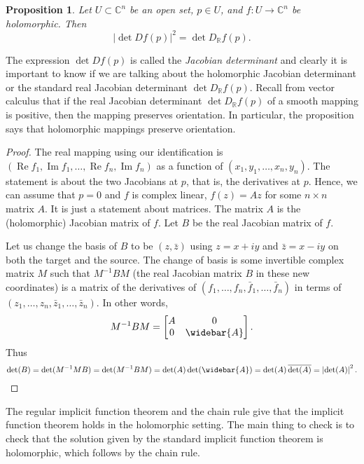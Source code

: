 \documentclass[12pt,openany]{book}
\renewcommand{\Re}{\operatorname{Re}}
\renewcommand{\Im}{\operatorname{Im}}
\newcommand{\abs}[1]{\left\lvert {#1} \right\rvert}
\newcommand{\C}{{\mathbb{C}}}
\newcommand{\R}{{\mathbb{R}}}
\newcommand{\myindex}[1]{#1\index{#1}}
\theoremstyle{plain}
\newtheorem{prop}[thm]{Proposition}
\theoremstyle{remark}
\theoremstyle{definition}
\theoremstyle{exercise}
\theoremstyle{example}
\begin{document}
\begin{prop}
Let $U \subset \C^n$ be an open set, $p \in U$, and 
$f \colon U \to \C^n$ be holomorphic.  Then
\begin{equation*}
\abs{\det D f(p) }^2 = 
\det D_\R f(p) .
\end{equation*}
\end{prop}

The expression $\det D f(p)$ is called the \emph{\myindex{Jacobian
determinant}} and clearly it is important to know if we are talking about
the holomorphic Jacobian determinant or the standard real Jacobian
determinant $\det D_\R f(p)$.  Recall from vector calculus that
if the real Jacobian determinant $\det D_\R
f(p)$ of a smooth mapping is positive, then the mapping preserves
orientation.  In particular, the proposition
says that holomorphic mappings preserve orientation.

\begin{proof}
The real mapping using our identification is
$(\Re f_1,\Im f_1, \ldots, \Re f_n, \Im f_n)$
as a function of $(x_1,y_1,\ldots,x_n,y_n)$.
The statement is about the two Jacobians at $p$, that is, the derivatives
at $p$.  Hence, we can assume that
$p=0$ and $f$ is complex linear, $f(z) = Az$ for some $n \times n$
matrix $A$.  It is just a statement about matrices.
The matrix $A$ is the (holomorphic) Jacobian matrix of $f$.
Let $B$ be the real Jacobian matrix of $f$.

Let us change the basis of $B$ to be $(z,\bar{z})$
using $z = x+iy$ and $\bar{z}=x-iy$
on both the target and the source.
The change of basis is some invertible
complex matrix $M$ such that
$M^{-1} B M$ (the real Jacobian matrix $B$ in these new coordinates)
is a matrix 
of the derivatives of
$(f_1,\ldots,f_n,\bar{f}_1,\ldots,\bar{f}_n)$
in terms of
$(z_1,\ldots,z_n,\bar{z}_1,\ldots,\bar{z}_n)$.
In other words,
\begin{equation*}
M^{-1} B M =
\begin{bmatrix}
A & 0 \\
0 & \widebar{A}
\end{bmatrix} .
\end{equation*}
Thus
\begin{equation*}
\det (B) =
\det(M^{-1}M B)
=
\det(M^{-1} B M)
=
\det(A) \det(\widebar{A})
=
\det(A) \, \overline{\det(A)}
=
\abs{\det(A)}^2 .  \qedhere
\end{equation*}
\end{proof}

The regular implicit function theorem and the chain rule
give that the implicit function theorem holds in the holomorphic setting.
The main thing to check is to check that the solution given by the
standard implicit function theorem is holomorphic, which follows by the
chain rule.
\end{document}
